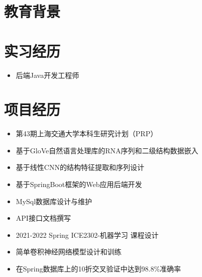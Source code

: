 \documentclass{resume}
\begin{document}




\section{教育背景}


\section{实习经历}

\begin{itemize}[parsep=0.5ex]
  \item 后端Java开发工程师
\end{itemize}
\section{项目经历}

\begin{itemize}[parsep=0.5ex]
  \item 第43期上海交通大学本科生研究计划（PRP）
  \item 基于GloVe自然语言处理库的RNA序列和二级结构数据嵌入
  \item 基于线性CNN的结构特征提取和序列设计
\end{itemize}

\begin{itemize}[parsep=0.5ex]
  \item 基于SpringBoot框架的Web应用后端开发
  \item MySql数据库设计与维护
  \item API接口文档撰写
\end{itemize}

\begin{itemize}[parsep=0.5ex]
  \item 2021-2022 Spring ICE2302-机器学习 课程设计
  \item 简单卷积神经网络模型设计和训练
  \item 在Spring数据库上的10折交叉验证中达到98.8\%准确率
\end{itemize}
\end{document}
